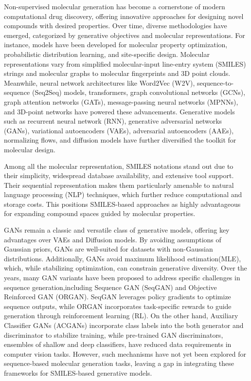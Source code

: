 \documentclass[10pt, twocolumn]{article}
\begin{document}
Non-supervised molecular generation has become a cornerstone of modern computational drug discovery, offering innovative approaches for designing novel compounds with desired properties. Over time, diverse methodologies have emerged, categorized by generative objectives and molecular representations. For instance, models have been developed for molecular property optimization, probabilistic distribution learning, and site-specific design\cite{Du2024}. Molecular representations vary from simplified molecular-input line-entry system (SMILES) strings and molecular graphs to molecular fingerprints and 3D point clouds\cite{Tong2021,Xie2022,Benoit2023}. Meanwhile, neural network architectures like Word2Vec (W2V), sequence-to-sequence (Seq2Seq) models, transformers, graph convolutional networks (GCNs), graph attention networks (GATs), message-passing neural networks (MPNNs), and 3D-point networks have powered these advancements. Generative models such as recurrent neural network (RNN), generative adversarial networks (GANs), variational autoencoders (VAEs), adversarial autoencoders (AAEs), normalizing flows, and diffusion models have further diversified the toolkit for molecular design\cite{Tong2021,Pang2024,Mswahili2024}.

Among all the molecular representation, SMILES notations stand out due to their simplicity, widespread database availability, and extensive tool support. Their sequential representation makes them particularly amenable to natural language processing (NLP) techniques, which further reduce computational and storage costs. This positions SMILES-based approaches as highly advantageous for expanding compound spaces guided by molecular properties.

GANs remain a classic and versatile class of generative models, offering key advantages over VAEs and Diffusion models. By avoiding assumptions of Gaussian priors, GANs are well-suited for datasets with non-Gaussian distributions. Additionally, GANs avoid maximum likelihood estimation(MLE), which, while stabilizing optimization, can constrain generative diversity\cite{Cao2018}. Over the years, many GAN variants have been proposed to address specific challenges in sequence generation,including Sequence GAN (SeqGAN)\cite{Yu2016} and Objective Reinforced GAN (ORGAN)\cite{Guimaraes2017}. SeqGAN leverages policy gradients to optimize sequence outputs, while ORGAN incorporates task-specific rewards to guide generation through reinforcement learning (RL). On the other hand, Auxiliary Classifier GANs (ACGANs)\cite{Odena2016} incorporate class labels into the both generator and discriminator to stabilize training, while pre-trained GAN discriminators\cite{Kumari2021}, ensembles of shallow and deep classifiers, have reduced data requirements in computer vision tasks. However, such mechanisms have not yet been explored for sequence-based molecular generation tasks, leaving a gap in integrating these frameworks for SMILES-based generative models.
\end{document}
